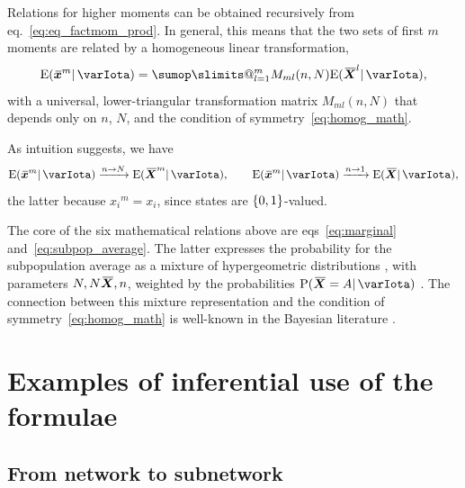 \documentclass{article}
\makeatletter
\theoremstyle{remark}
\theoremstyle{innote}
\def\sum{\DOTSI\sumop\slimits@}
\newcommand*{\citep}{\parencites}
\renewcommand*{\|}{\mathpunct{|}}%
\DeclarePairedDelimiter\set{\{}{\}}
\newcommand*{\p}{\mathrm{P}}%
\newcommand*{\sect}{\S}%
\newcommand*{\chap}{ch.}%
\newcommand*{\eqn}{eq.}%
\newcommand*{\eqns}{eqs}%
\newcommand*{\cf}{{cf.}}
\newcommand*{\E}{\mathrm{E}}
\DeclarePairedDelimiter\expp{(}{)}
\newcommand*{\expe}{\E\expp}%
\theoremstyle{simple}
\newcommand*{\widebar}[1]{{\mkern1.5mu\skew{2}\overline{\mkern-1.5mu#1\mkern-1.5mu}\mkern 1.5mu}}
\newcommand*{\av}{\widebar} %
\newcommand*{\sav}{\widebar} %
\newcommand*{\yxx}{x}%
\newcommand*{\yx}{\bm{\yxx}}%
\newcommand*{\yxs}{\sav{\yx}}%
\newcommand*{\yX}{\bm{X}}%
\newcommand*{\yXf}{\av{\yX}}%
\newcommand*{\yH}{\varIota}
\makeatother
\begin{document}
Relations for higher moments can be obtained recursively from
\eqn~\eqref{eq:eq_factmom_prod}. In general, this means that the two sets of
first $m$ moments are related by a homogeneous linear transformation,
\begin{equation}
  \label{eq:lin_transf_moments}
  \expe{\yxs^m \| \yH} = \sum_{l=1}^m M_{ml}(n,N) \expe{\yXf^l \| \yH},
\end{equation}
with a universal, lower-triangular transformation matrix $M_{ml}(n,N)$ that
depends only on $n$, $N$, and the condition of symmetry~\eqref{eq:homog_math}.

As intuition suggests, we have 
\begin{equation}
  \label{eq:limit_moments}
  \expe{\yxs^m \| \yH} \xrightarrow{n\to N} 
  \expe{\yXf^m \| \yH},
\qquad
  \expe{\yxs^m \| \yH} \xrightarrow{n\to 1} 
  \expe{\yXf \| \yH},
\end{equation}
the latter because ${x_i}^m=x_i$, since states are $\set{0,1}$-valued.

\bigskip

The core of the six mathematical relations above are
\eqns~\eqref{eq:marginal} and~\eqref{eq:subpop_average}. The latter
expresses the probability for the subpopulation average as a mixture of
hypergeometric distributions
\cites[\chap~3]{jaynes1994_r2003}[\sect~4.8.3]{ross1976_r2010}[\sect~II.6]{feller1950_r1968},
with parameters $N,N\yXf,n$, weighted by the probabilities
$\p(\yXf = A \|\yH)$ \citep[\cf][\sect~4, esp.\ \eqn~(22)]{kendall1967}.
The connection between this mixture representation and the condition of
symmetry~\eqref{eq:homog_math} is well-known in the Bayesian literature
\citep{kendall1967,definetti1969b,heathetal1976,diaconis1977,diaconisetal1980,jaynes1986c}.


\section{Examples of inferential use of the formulae}

\subsection{From network to subnetwork}
\label{sec:pop2sub_examples}
\end{document}
